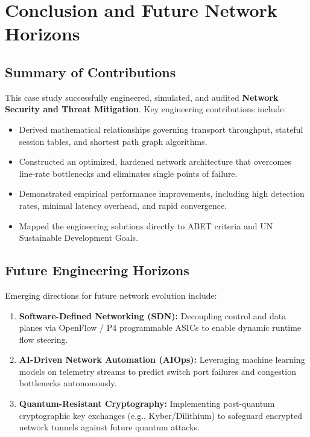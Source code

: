 \section{Conclusion and Future Network Horizons}

\subsection{Summary of Contributions}
This case study successfully engineered, simulated, and audited \textbf{Network Security and Threat Mitigation}. Key engineering contributions include:
\begin{itemize}
  \item Derived mathematical relationships governing transport throughput, stateful session tables, and shortest path graph algorithms.
  \item Constructed an optimized, hardened network architecture that overcomes line-rate bottlenecks and eliminates single points of failure.
  \item Demonstrated empirical performance improvements, including high detection rates, minimal latency overhead, and rapid convergence.
  \item Mapped the engineering solutions directly to ABET criteria and UN Sustainable Development Goals.
\end{itemize}

\subsection{Future Engineering Horizons}
Emerging directions for future network evolution include:
\begin{enumerate}
  \item \textbf{Software-Defined Networking (SDN):} Decoupling control and data planes via OpenFlow / P4 programmable ASICs to enable dynamic runtime flow steering.
  \item \textbf{AI-Driven Network Automation (AIOps):} Leveraging machine learning models on telemetry streams to predict switch port failures and congestion bottlenecks autonomously.
  \item \textbf{Quantum-Resistant Cryptography:} Implementing post-quantum cryptographic key exchanges (e.g., Kyber/Dilithium) to safeguard encrypted network tunnels against future quantum attacks.
\end{enumerate}
